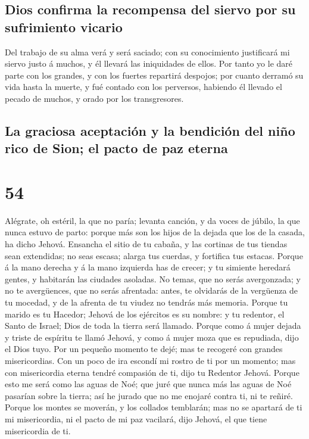 \hypertarget{dios-confirma-la-recompensa-del-siervo-por-su-sufrimiento-vicario}{%
\subsection{Dios confirma la recompensa del siervo por su sufrimiento
vicario}\label{dios-confirma-la-recompensa-del-siervo-por-su-sufrimiento-vicario}}

 Del trabajo de su alma verá y será saciado; con su
conocimiento justificará mi siervo justo á muchos, y él llevará las
iniquidades de ellos.  Por tanto yo le daré parte con los
grandes, y con los fuertes repartirá despojos; por cuanto derramó su
vida hasta la muerte, y fué contado con los perversos, habiendo él
llevado el pecado de muchos, y orado por los transgresores.

\hypertarget{la-graciosa-aceptaciuxf3n-y-la-bendiciuxf3n-del-niuxf1o-rico-de-sion-el-pacto-de-paz-eterna}{%
\subsection{La graciosa aceptación y la bendición del niño rico de Sion;
el pacto de paz
eterna}\label{la-graciosa-aceptaciuxf3n-y-la-bendiciuxf3n-del-niuxf1o-rico-de-sion-el-pacto-de-paz-eterna}}

\hypertarget{section-53}{%
\section{54}\label{section-53}}

 Alégrate, oh estéril, la que no paría; levanta canción, y
da voces de júbilo, la que nunca estuvo de parto: porque más son los
hijos de la dejada que los de la casada, ha dicho Jehová. 
Ensancha el sitio de tu cabaña, y las cortinas de tus tiendas sean
extendidas; no seas escasa; alarga tus cuerdas, y fortifica tus estacas.
 Porque á la mano derecha y á la mano izquierda has de
crecer; y tu simiente heredará gentes, y habitarán las ciudades
asoladas.  No temas, que no serás avergonzada; y no te
avergüences, que no serás afrentada: antes, te olvidarás de la vergüenza
de tu mocedad, y de la afrenta de tu viudez no tendrás más memoria.
 Porque tu marido es tu Hacedor; Jehová de los ejércitos
es su nombre: y tu redentor, el Santo de Israel; Dios de toda la tierra
será llamado.  Porque como á mujer dejada y triste de
espíritu te llamó Jehová, y como á mujer moza que es repudiada, dijo el
Dios tuyo.  Por un pequeño momento te dejé; mas te
recogeré con grandes misericordias.  Con un poco de ira
escondí mi rostro de ti por un momento; mas con misericordia eterna
tendré compasión de ti, dijo tu Redentor Jehová.  Porque
esto me será como las aguas de Noé; que juré que nunca más las aguas de
Noé pasarían sobre la tierra; así he jurado que no me enojaré contra ti,
ni te reñiré.  Porque los montes se moverán, y los
collados temblarán; mas no se apartará de ti mi misericordia, ni el
pacto de mi paz vacilará, dijo Jehová, el que tiene misericordia de ti.

